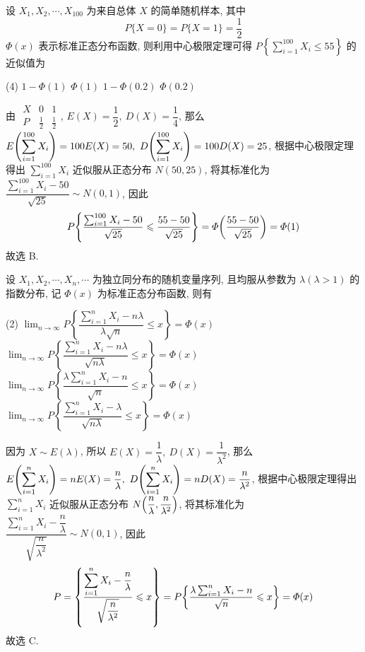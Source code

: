 \begin{example}[2022 数一]
    设 $ X_{1}, X_{2}, \cdots, X_{100} $ 为来自总体 $ X $ 的简单随机样本, 
    其中 $$ P\{X=0\}=P\{X=1\}=\dfrac{1}{2}$$ 
    $\varPhi(x) $ 表示标准正态分布函数, 则利用中心极限定理可得 $ \displaystyle P\left\{\sum_{i=1}^{100} X_{i} \leqslant 55\right\} $ 的近似值为 
    \begin{tasks}(4)
        \task $1-\varPhi(1)$
        \task $\varPhi(1)$
        \task $1-\varPhi(0.2)$
        \task $\varPhi(0.2)$
    \end{tasks}
\end{example}
\begin{solution}
    由 $\begin{array}{c|cc}
        X & 0           & 1           \\\hline
        P & \frac{1}{2} & \frac{1}{2}
    \end{array}$, $E(X)=\dfrac{1}{2},~D(X)=\dfrac{1}{4}$, 那么 $\displaystyle E\qty(\sum_{i=1}^{100}X_i)=100E(X)=50,~D\qty(\sum_{i=1}^{100}X_i)=100 D(X)=25$, 根据中心极限定理得出
    $\displaystyle\sum_{i=1}^{100}X_i$ 近似服从正态分布 $N(50,25)$, 将其标准化为 $\dfrac{\displaystyle\sum_{i=1}^{100}X_i-50}{\sqrt{25}}\sim N(0,1)$, 因此 
    $$P\qty{\dfrac{\sum_{i=1}^{100}X_i-50}{\sqrt{25}}\leqslant \dfrac{55-50}{\sqrt{25}}}=\varPhi\qty(\dfrac{55-50}{\sqrt{25}})=\varPhi(1)$$
    故选 B.
\end{solution}

\begin{example}
    设 $ X_{1}, X_{2}, \cdots, X_{n}, \cdots $ 为独立同分布的随机变量序列, 且均服从参数为 $ \lambda(\lambda>1) $ 的指数分布, 记 $ \varPhi(x) $ 为标准正态分布函数, 则有
    \begin{tasks}(2)
        \task $\displaystyle \lim _{n \rightarrow \infty} P\left\{\dfrac{\sum_{i=1}^{n} X_{i}-n \lambda}{\lambda \sqrt{n}} \leqslant x\right\}=\varPhi(x) $
        \task $\displaystyle \lim _{n \rightarrow \infty} P\left\{\dfrac{\sum_{i=1}^{n} X_{i}-n \lambda}{\sqrt{n \lambda}} \leqslant x\right\}=\varPhi(x) $
        \task $\displaystyle \lim _{n \rightarrow \infty} P\left\{\dfrac{\lambda \sum_{i=1}^{n} X_{i}-n}{\sqrt{n}} \leqslant x\right\}=\varPhi(x) $
        \task $\displaystyle \lim _{n \rightarrow \infty} P\left\{\dfrac{\sum_{i=1}^{n} X_{i}-\lambda}{\sqrt{n \lambda}} \leqslant x\right\}=\varPhi(x) $
    \end{tasks}
\end{example}
\begin{solution}
    因为 $X\sim E(\lambda)$, 所以 $E(X)=\dfrac{1}{\lambda},~D(X)=\dfrac{1}{\lambda^2}$, 那么 $E\qty(\displaystyle\sum_{i=1}^{n}X_i)=nE(X)=\dfrac{n}{\lambda},~D\qty(\displaystyle \sum_{i=1}^{n}X_i)=nD(X)=\dfrac{n}{\lambda^2}$, 
    根据中心极限定理得出 $\displaystyle\sum_{i=1}^{n}X_i$ 近似服从正态分布 $N\qty(\dfrac{n}{\lambda},\dfrac{n}{\lambda^2})$, 将其标准化为 $\dfrac{\displaystyle\sum_{i=1}^{n}X_i-\dfrac{n}{\lambda}}{\sqrt{\dfrac{n}{\lambda^2}}}\sim N(0,1)$, 因此 
    $$P=\qty{\dfrac{\displaystyle\sum_{i=1}^{n}X_i-\dfrac{n}{\lambda}}{\sqrt{\dfrac{n}{\lambda^2}}}\leqslant x}=P\qty{\dfrac{\lambda\sum_{i=1}^{n}X_i-n}{\sqrt{n}}\leqslant x}=\varPhi(x)$$
    故选 C.
\end{solution}

